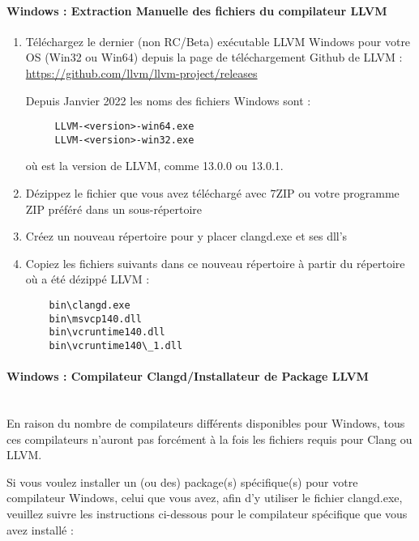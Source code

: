 \paragraph*{Windows : Extraction Manuelle des fichiers du compilateur LLVM}\label{sec:llvm_extract}
\begin{enumerate}[noitemsep]
\item Téléchargez le dernier (non RC/Beta) exécutable LLVM Windows pour votre OS (Win32 ou Win64) depuis la page de téléchargement Github de LLVM : \newline
      \url{https://github.com/llvm/llvm-project/releases} \newline

  Depuis Janvier 2022 les noms des fichiers Windows sont :
  \begin{verbatim}
     LLVM-<version>-win64.exe
     LLVM-<version>-win32.exe
  \end{verbatim}
  où  est la version de LLVM, comme 13.0.0 ou 13.0.1.\\

\item Dézippez le fichier  que vous avez téléchargé avec 7ZIP ou votre programme ZIP préféré dans un sous-répertoire
\item Créez un nouveau répertoire pour y placer clangd.exe et ses dll's
\item Copiez les fichiers suivants dans ce nouveau répertoire à partir du répertoire où a été dézippé LLVM :
    \begin{verbatim}
    bin\clangd.exe
    bin\msvcp140.dll
    bin\vcruntime140.dll
    bin\vcruntime140\_1.dll
    \end{verbatim}
\end{enumerate}

\paragraph*{Windows : Compilateur Clangd/Installateur de Package LLVM}\label{sec:win_packages} \hspace{0pt} \\
   En raison du nombre de compilateurs différents disponibles pour Windows, tous ces compilateurs n'auront pas forcément à la fois 
   les fichiers requis pour Clang ou LLVM.

   Si vous voulez installer un (ou des) package(s) spécifique(s) pour votre compilateur Windows, celui que vous avez, afin d'y utiliser le fichier clangd.exe, veuillez suivre les instructions ci-dessous pour le compilateur spécifique que vous avez installé :

